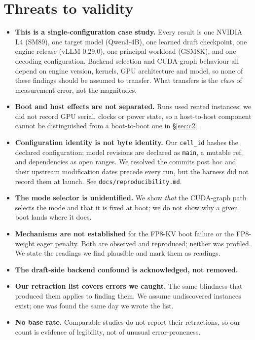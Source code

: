\documentclass[11pt]{article}
\newcommand{\tw}[1]{\texttt{\small #1}}
\begin{document}
\section{Threats to validity}\label{sec:threats}

\begin{itemize}\itemsep2pt
\item \textbf{This is a single-configuration case study.} Every result is
one NVIDIA L4 (SM89), one target model (Qwen3-4B), one learned draft
checkpoint, one engine release (vLLM 0.29.0), one principal workload
(GSM8K), and one decoding configuration. Backend selection and CUDA-graph
behaviour all depend on engine version, kernels, GPU architecture and model,
so none of these findings should be assumed to transfer. What transfers is
the \emph{class} of measurement error, not the magnitudes.
\item \textbf{Boot and host effects are not separated.} Runs used rented
instances; we did not record GPU serial, clocks or power state, so a
host-to-host component cannot be distinguished from a boot-to-boot one in
\S\ref{sec:c2}.
\item \textbf{Configuration identity is not byte identity.} Our
\tw{cell\_id} hashes the declared configuration; model revisions are
declared as \tw{main}, a mutable ref, and dependencies as open ranges. We
resolved the commits post hoc and their upstream modification dates precede
every run, but the harness did not record them at launch. See
\tw{docs/reproducibility.md}.
\item \textbf{The mode selector is unidentified.} We show \emph{that} the
CUDA-graph path selects the mode and that it is fixed at boot; we do not show
why a given boot lands where it does.
\item \textbf{Mechanisms are not established} for the FP8-KV boot failure or
the FP8-weight eager penalty. Both are observed and reproduced; neither was
profiled. We state the readings we find plausible and mark them as readings.
\item \textbf{The draft-side backend confound is acknowledged, not removed.}
\item \textbf{Our retraction list covers errors we caught.} The same
blindness that produced them applies to finding them. We assume undiscovered
instances exist; one was found the same day we wrote the list.
\item \textbf{No base rate.} Comparable studies do not report their
retractions, so our count is evidence of legibility, not of unusual
error-proneness.
\end{itemize}
\end{document}
